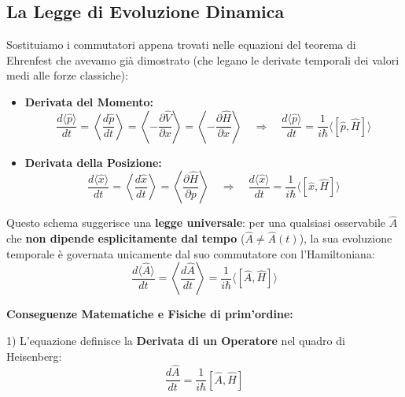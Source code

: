 \documentclass[11pt, a4paper]{article}
\begin{document}
\subsection{La Legge di Evoluzione Dinamica} %

Sostituiamo i commutatori appena trovati nelle equazioni del teorema di Ehrenfest che avevamo già dimostrato (che legano le derivate temporali dei valori medi alle forze classiche): %

\begin{itemize}
    \item \textbf{Derivata del Momento:} %
    \begin{equation*}
        \frac{d\langle\hat{p}\rangle}{dt} = \left\langle \frac{d\hat{p}}{dt} \right\rangle = \left\langle -\frac{\partial \hat{V}}{\partial x} \right\rangle = \left\langle -\frac{\partial \hat{H}}{\partial x} \right\rangle \quad \Rightarrow \quad \boxed{ \frac{d\langle\hat{p}\rangle}{dt} = \frac{1}{i\hbar} \langle [\hat{p}, \hat{H}] \rangle } %
    \end{equation*}

    \item \textbf{Derivata della Posizione:} %
    \begin{equation*}
        \frac{d\langle\hat{x}\rangle}{dt} = \left\langle \frac{d\hat{x}}{dt} \right\rangle = \left\langle \frac{\partial \hat{H}}{\partial p} \right\rangle \quad \Rightarrow \quad \boxed{ \frac{d\langle\hat{x}\rangle}{dt} = \frac{1}{i\hbar} \langle [\hat{x}, \hat{H}] \rangle } %
    \end{equation*}
\end{itemize}

\noindent
Questo schema suggerisce una \textbf{legge universale}: per una qualsiasi osservabile $\hat{A}$ che \textbf{non dipende esplicitamente dal tempo} ($\hat{A} \neq \hat{A}(t)$), la sua evoluzione temporale è governata unicamente dal suo commutatore con l'Hamiltoniana: %
\begin{equation}
    \boxed{ \frac{d\langle\hat{A}\rangle}{dt} = \left\langle \frac{d\hat{A}}{dt} \right\rangle = \frac{1}{i\hbar} \langle [\hat{A}, \hat{H}] \rangle } %
\end{equation}

\textbf{Conseguenze Matematiche e Fisiche di prim'ordine:} %

1) L'equazione definisce la \textbf{Derivata di un Operatore} nel quadro di Heisenberg: %
\begin{equation*}
    \frac{d\hat{A}}{dt} = \frac{1}{i\hbar} [\hat{A}, \hat{H}] %
\end{equation*}
\end{document}
